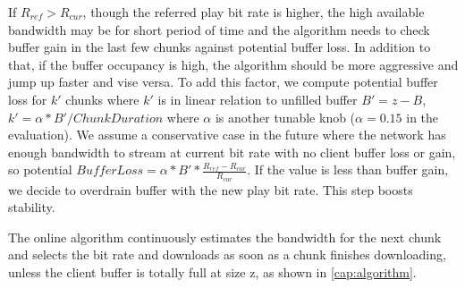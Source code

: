 
If $R_{ref} >R_{cur} $, though the referred play bit rate is higher,
the high available bandwidth may be for short period of time and the
algorithm needs to check buffer gain in the last few chunks against
potential buffer loss. In addition to that, if the buffer occupancy is
high, the algorithm should be more aggressive and jump up faster and
vise versa. To add this factor, we compute potential buffer loss for
$k'$ chunks where $k'$ is in linear relation to unfilled buffer
$B'=z-B$, $k'=\alpha * B'/ChunkDuration$ where $\alpha$ is another tunable knob ($\alpha=0.15$ in the evaluation). 
We assume a conservative case in the
future where the network has enough bandwidth to stream at current bit
rate with no client buffer loss or gain, so potential $BufferLoss=\alpha *
B' *\frac{R_{ref}-R_{cur}}{R_{cur}} $. If the value is less than buffer
gain, we decide to overdrain buffer with the new play bit rate. This
step boosts stability.





The online algorithm continuously estimates the bandwidth for the next
chunk and selects the bit rate and downloads as soon as a chunk finishes downloading, unless the client
buffer is totally full at size z, as shown in
\autoref{cap:algorithm}. 




